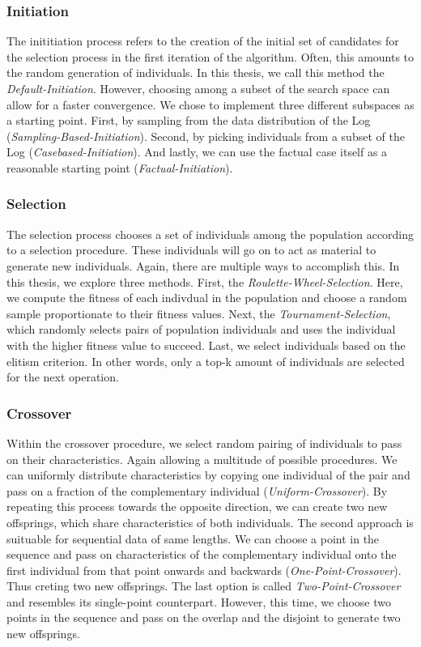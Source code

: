 \documentclass[./../../paper.tex]{subfiles}
\begin{document}
\subsubsection{Initiation}
The inititiation process refers to the creation of the initial set of candidates for the selection process in the first iteration of the algorithm. Often, this amounts to the random generation of individuals. In this thesis, we call this method the \emph{Default-Initiation}. However, choosing among a subset of the search space can allow for a faster convergence. We chose to implement three different subspaces as a starting point. First, by sampling from the data distribution of the Log (\emph{Sampling-Based-Initiation}). Second, by picking individuals from a subset of the Log (\emph{Casebased-Initiation}). And lastly, we can use the factual case itself as a reasonable starting point (\emph{Factual-Initiation}).

\subsubsection{Selection}
The selection process chooses a set of individuals among the population according to a selection procedure. These individuals will go on to act as material to generate new individuals. Again, there are multiple ways to accomplish this. In this thesis, we explore three methods. First, the \emph{Roulette-Wheel-Selection}. Here, we compute the fitness of each indivdual in the population and choose a random sample proportionate to their fitness values. Next, the \emph{Tournament-Selection}, which randomly selects pairs of population individuals and uses the individual with the higher fitness value to succeed. Last, we select individuals based on the elitism criterion. In other words, only a top-k amount of individuals are selected for the next operation.

\subsubsection{Crossover}
Within the crossover procedure, we select random pairing of individuals to pass on their characteristics. Again allowing a multitude of possible procedures. We can uniformly distribute characteristics by copying one individual of the pair and pass on a fraction of the complementary individual (\emph{Uniform-Crossover}). By repeating this process towards the opposite direction, we can create two new offsprings, which share characteristics of both individuals. The second approach is suituable for sequential data of same lengths. We can choose a point in the sequence and pass on characteristics of the complementary individual onto the first individual from that point onwards and backwards (\emph{One-Point-Crossover}). Thus creting two new offsprings. The last option is called \emph{Two-Point-Crossover} and resembles its single-point counterpart. However, this time, we choose two points in the sequence and pass on the overlap and the disjoint to generate two new offsprings.
\end{document}
